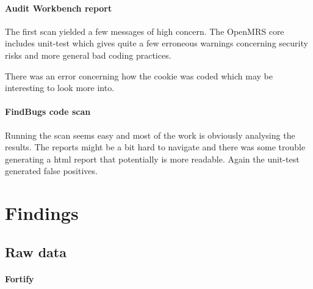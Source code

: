 \documentclass{article}
\begin{document}
\paragraph{Audit Workbench report}  

  The first scan yielded a few messages of high concern. The OpenMRS core
  includes unit-test which gives quite a few erroneous warnings concerning
  security risks and more general bad coding practices. 

  There was an error concerning how the cookie was coded which may be
  interesting to look more into.

\paragraph{FindBugs code scan}

  Running the scan seems easy and most of the work is obviously analysing the
  results. The reports might be a bit hard to navigate and there was some
  trouble generating a html report that potentially is more readable. Again the
  unit-test generated false positives.
  
\begin{comment}
\paragraph{Dependencies}
  \begin{itemize}
    \item MySQL 1.6
    \item tomcat 7
    \item spring framework
    \item jsp
    \item java .. 1.7
  \end{itemize}
\end{comment}

  \newpage
  

\section{Findings}

\subsection{Raw data}

\paragraph{Fortify}
\end{document}
